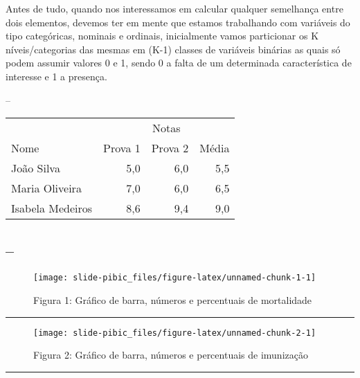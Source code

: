 \documentclass[
]{article}
\begin{document}
Antes de tudo, quando nos interessamos em calcular qualquer semelhança
entre dois elementos, devemos ter em mente que estamos trabalhando com
variáveis do tipo categóricas, nominais e ordinais, inicialmente vamos
particionar os K níveis/categorias das mesmas em (K-1) classes de
variáveis binárias as quais só podem assumir valores 0 e 1, sendo 0 a
falta de um determinada característica de interesse e 1 a presença.

--

\begin{tabular}{ l r r r }
  \hline & \multicolumn{3}{c}{Notas}\\
  \cline{2 - 4} %
  \multirow[c]{-2}{*}{Nome} & Prova 1 & Prova 2 & Média\\
  \hline
João Silva & 5{,}0 & 6{,}0 & 5{,}5\\
Maria Oliveira & 7{,}0 & 6{,}0 & 6{,}5\\
Isabela Medeiros & 8{,}6 & 9{,}4 & 9{,}0\\
  \hline
\end{tabular}

\hypertarget{section}{%
\subsection{--}\label{section}}

\begin{figure}

{\centering \texttt{[image: slide-pibic\_files/figure-latex/unnamed-chunk-1-1]} 

}

\caption{Figura 1: Gráfico de barra, números e percentuais de mortalidade}\label{fig:unnamed-chunk-1}
\end{figure}

\begin{center}\rule{0.5\linewidth}{0.5pt}\end{center}

\begin{figure}

{\centering \texttt{[image: slide-pibic\_files/figure-latex/unnamed-chunk-2-1]} 

}

\caption{Figura 2: Gráfico de barra, números e percentuais de imunização}\label{fig:unnamed-chunk-2}
\end{figure}

\begin{center}\rule{0.5\linewidth}{0.5pt}\end{center}
\end{document}
